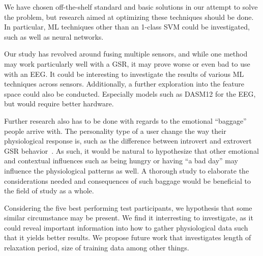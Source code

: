 We have chosen off-the-shelf standard and basic solutions in our attempt to solve the problem, but research aimed at optimizing these techniques should be done. 
In particular, ML techniques other than an 1-class SVM could be investigated, such as well as neural networks.

Our study has revolved around fusing multiple sensors, and while one method may work particularly well with a GSR, it may prove worse or even bad to use with an EEG. 
It could be interesting to investigate the results of various ML techniques across sensors.
Additionally, a further exploration into the feature space could also be conducted. 
Especially models such as DASM12\cite{eeg_music_listening} for the EEG, but would require better hardware.

Further research also has to be done with regards to the emotional ``baggage'' people arrive with. 
The personality type of a user change the way their physiological response is, such as the difference between introvert and extrovert GSR behavior~\cite{Foglia20081814}.
As such, it would be natural to hypothesize that other emotional and contextual influences such as being hungry or having ``a bad day'' may influence the physiological patterns as well. 
A thorough study to elaborate the considerations needed and consequences of such baggage would be beneficial to the field of study as a whole. 

Considering the five best performing test participants, we hypothesis that some similar circumstance may be present. We
find it interresting to investigate, as it could reveal important information into how to gather physiological data such
that it yields better results. We propose future work that investigates length of relaxation period, size of training
data among other things.
